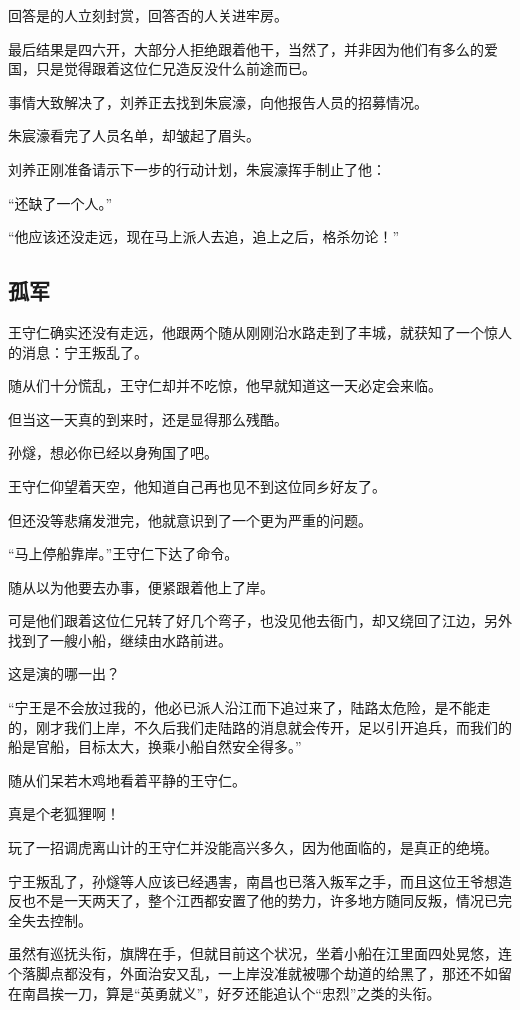 \begin{multicols}{\theparacolNo}
回答是的人立刻封赏，回答否的人关进牢房。

最后结果是四六开，大部分人拒绝跟着他干，当然了，并非因为他们有多么的爱国，只是觉得跟着这位仁兄造反没什么前途而已。

事情大致解决了，刘养正去找到朱宸濠，向他报告人员的招募情况。

朱宸濠看完了人员名单，却皱起了眉头。

刘养正刚准备请示下一步的行动计划，朱宸濠挥手制止了他：

“还缺了一个人。”

“他应该还没走远，现在马上派人去追，追上之后，格杀勿论！”

\subsection{孤军}
王守仁确实还没有走远，他跟两个随从刚刚沿水路走到了丰城，就获知了一个惊人的消息：宁王叛乱了。

随从们十分慌乱，王守仁却并不吃惊，他早就知道这一天必定会来临。

但当这一天真的到来时，还是显得那么残酷。

孙燧，想必你已经以身殉国了吧。

王守仁仰望着天空，他知道自己再也见不到这位同乡好友了。

但还没等悲痛发泄完，他就意识到了一个更为严重的问题。

“马上停船靠岸。”王守仁下达了命令。

随从以为他要去办事，便紧跟着他上了岸。

可是他们跟着这位仁兄转了好几个弯子，也没见他去衙门，却又绕回了江边，另外找到了一艘小船，继续由水路前进。

这是演的哪一出？

“宁王是不会放过我的，他必已派人沿江而下追过来了，陆路太危险，是不能走的，刚才我们上岸，不久后我们走陆路的消息就会传开，足以引开追兵，而我们的船是官船，目标太大，换乘小船自然安全得多。”

随从们呆若木鸡地看着平静的王守仁。

真是个老狐狸啊！

玩了一招调虎离山计的王守仁并没能高兴多久，因为他面临的，是真正的绝境。

宁王叛乱了，孙燧等人应该已经遇害，南昌也已落入叛军之手，而且这位王爷想造反也不是一天两天了，整个江西都安置了他的势力，许多地方随同反叛，情况已完全失去控制。

虽然有巡抚头衔，旗牌在手，但就目前这个状况，坐着小船在江里面四处晃悠，连个落脚点都没有，外面治安又乱，一上岸没准就被哪个劫道的给黑了，那还不如留在南昌挨一刀，算是“英勇就义”，好歹还能追认个“忠烈”之类的头衔。


\end{multicols}
